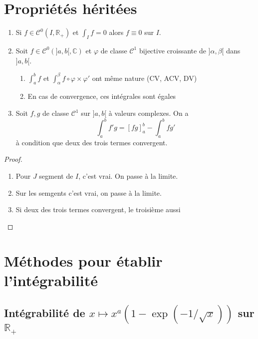 \section{Propriétés héritées}

\begin{prop}
    \begin{enumerate}
        \item Si $f\in\mathcal C^0(I, \mathbb R_+)$ et $\int_If=0$ alors $f\equiv 0$ sur $I$.
        \item Soit $f\in\mathcal C^0(]a, b[, \mathbb C)$ et $\varphi$ de classe $\mathcal C^1$ bijective croissante de $]\alpha, \beta[$ dans $]a, b[$. \begin{enumerate}
            \item $\int_a^bf$ et $\int_\alpha^\beta f\circ \varphi\times \varphi'$ ont même nature (CV, ACV, DV)
            \item En cas de convergence, ces intégrales sont égales
        \end{enumerate}
    \item Soit $f, g$ de classe $\mathcal C^1$ sur $]a, b[$ à valeurs complexes. On a \[
            \int_a^bf'g=[fg]_a^b-\int_a^bfg'
        \]
        à condition que deux des trois termes convergent.
    \end{enumerate}
\end{prop}

\begin{proof}~
    \begin{enumerate}
        \item Pour $J$ segment de $I$, c'est vrai. On passe à la limite.
        \item Sur les semgents c'est vrai, on passe à la limite.
        \item Si deux des trois termes convergent, le troisième aussi
    \end{enumerate}
\end{proof}

\section{Méthodes pour établir l'intégrabilité}

\subsection{Intégrabilité de $x\longmapsto x^a(1-\exp(-1/\sqrt x))$ sur $\mathbb R_+$}
